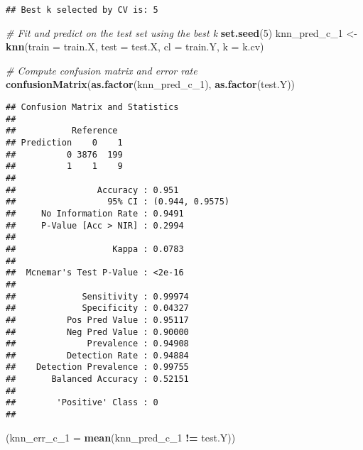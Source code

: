 \documentclass[
]{article}
\newenvironment{Shaded}{\begin{snugshade}}{\end{snugshade}}
\newcommand{\AttributeTok}[1]{\textcolor[rgb]{0.13,0.29,0.53}{#1}}
\newcommand{\CommentTok}[1]{\textcolor[rgb]{0.56,0.35,0.01}{\textit{#1}}}
\newcommand{\DecValTok}[1]{\textcolor[rgb]{0.00,0.00,0.81}{#1}}
\newcommand{\FunctionTok}[1]{\textcolor[rgb]{0.13,0.29,0.53}{\textbf{#1}}}
\newcommand{\NormalTok}[1]{#1}
\newcommand{\OtherTok}[1]{\textcolor[rgb]{0.56,0.35,0.01}{#1}}
\newcommand{\SpecialCharTok}[1]{\textcolor[rgb]{0.81,0.36,0.00}{\textbf{#1}}}
\begin{document}
\begin{verbatim}
## Best k selected by CV is: 5
\end{verbatim}

\begin{Shaded}
\begin{Highlighting}[]
\CommentTok{\# Fit and predict on the test set using the best k}
\FunctionTok{set.seed}\NormalTok{(}\DecValTok{5}\NormalTok{)}
\NormalTok{knn\_pred\_c\_1 }\OtherTok{\textless{}{-}} \FunctionTok{knn}\NormalTok{(}\AttributeTok{train =}\NormalTok{ train.X, }\AttributeTok{test =}\NormalTok{ test.X, }\AttributeTok{cl =}\NormalTok{ train.Y, }\AttributeTok{k =}\NormalTok{ k.cv)}

\CommentTok{\# Compute confusion matrix and error rate}
\FunctionTok{confusionMatrix}\NormalTok{(}\FunctionTok{as.factor}\NormalTok{(knn\_pred\_c\_1), }\FunctionTok{as.factor}\NormalTok{(test.Y))}
\end{Highlighting}
\end{Shaded}

\begin{verbatim}
## Confusion Matrix and Statistics
## 
##           Reference
## Prediction    0    1
##          0 3876  199
##          1    1    9
##                                          
##                Accuracy : 0.951          
##                  95% CI : (0.944, 0.9575)
##     No Information Rate : 0.9491         
##     P-Value [Acc > NIR] : 0.2994         
##                                          
##                   Kappa : 0.0783         
##                                          
##  Mcnemar's Test P-Value : <2e-16         
##                                          
##             Sensitivity : 0.99974        
##             Specificity : 0.04327        
##          Pos Pred Value : 0.95117        
##          Neg Pred Value : 0.90000        
##              Prevalence : 0.94908        
##          Detection Rate : 0.94884        
##    Detection Prevalence : 0.99755        
##       Balanced Accuracy : 0.52151        
##                                          
##        'Positive' Class : 0              
## 
\end{verbatim}

\begin{Shaded}
\begin{Highlighting}[]
\NormalTok{(}\AttributeTok{knn\_err\_c\_1 =} \FunctionTok{mean}\NormalTok{(knn\_pred\_c\_1 }\SpecialCharTok{!=}\NormalTok{ test.Y))}
\end{Highlighting}
\end{Shaded}
\end{document}
